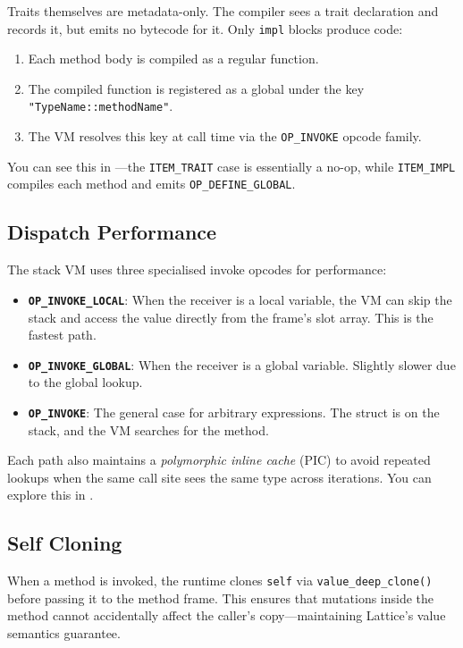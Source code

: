 Traits themselves are metadata-only. The compiler sees a trait declaration
and records it, but emits no bytecode for it. Only \lstinline|impl| blocks
produce code:

\begin{enumerate}
  \item Each method body is compiled as a regular function.
  \item The compiled function is registered as a global under the key
    \texttt{"TypeName::methodName"}.
  \item The VM resolves this key at call time via the \texttt{OP\_INVOKE}
    opcode family.
\end{enumerate}

You can see this in ---the
\texttt{ITEM\_TRAIT} case is essentially a no-op, while \texttt{ITEM\_IMPL}
compiles each method and emits \texttt{OP\_DEFINE\_GLOBAL}.

\subsection{Dispatch Performance}

The stack VM uses three specialised invoke opcodes for performance:

\begin{itemize}
  \item \textbf{\texttt{OP\_INVOKE\_LOCAL}}: When the receiver is a local
    variable, the VM can skip the stack and access the value directly from
    the frame's slot array. This is the fastest path.
  \item \textbf{\texttt{OP\_INVOKE\_GLOBAL}}: When the receiver is a global
    variable. Slightly slower due to the global lookup.
  \item \textbf{\texttt{OP\_INVOKE}}: The general case for arbitrary
    expressions. The struct is on the stack, and the VM searches for the
    method.
\end{itemize}

Each path also maintains a \emph{polymorphic inline cache} (PIC) to avoid
repeated lookups when the same call site sees the same type across
iterations. You can explore this in .

\subsection{Self Cloning}

When a method is invoked, the runtime clones \lstinline|self| via
\texttt{value\_deep\_clone()} before passing it to the method frame.
This ensures that mutations inside the method cannot accidentally affect
the caller's copy---maintaining Lattice's value semantics guarantee.

